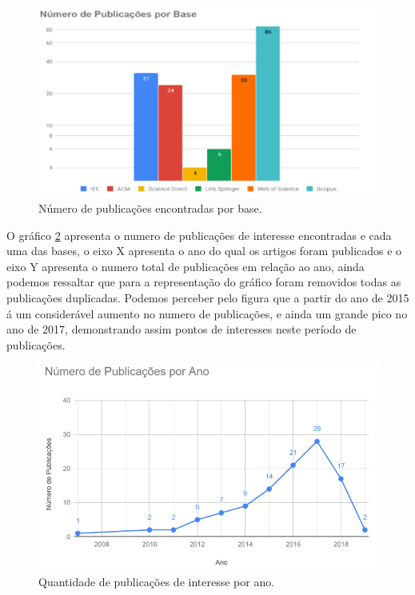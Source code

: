 \documentclass[tid,table]{texufpel} %
\begin{document}
\begin{figure}[ht]
	\centering
	\includegraphics[width=.9\textwidth]{imagens/GrafBarraPubAno.png}
	\caption{Número de publicações encontradas por base.}
	\label{fig:GrafBarraPubAno}
\end{figure}


O gráfico \ref{fig:grafPublicaAno} apresenta o numero de publicações de interesse encontradas e cada uma das bases, o eixo X apresenta o ano do qual os artigos foram publicados e o eixo Y apresenta o numero total de publicações em relação ao ano, ainda podemos ressaltar que para a representação do gráfico foram removidos todas as publicações duplicadas. Podemos perceber pelo figura que a partir do ano de 2015 á um considerável aumento no numero de publicações, e ainda um grande pico no ano de 2017, demonstrando assim pontos de interesses neste período de publicações.

\begin{figure}[ht]
	\centering
	\includegraphics[width=.9\textwidth]{imagens/grafPublicaAno.png}
	\caption{Quantidade de publicações de interesse por ano.}
	\label{fig:grafPublicaAno}
\end{figure}
\end{document}
